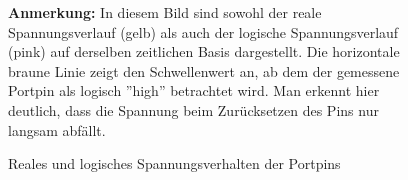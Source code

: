 \begin{figure}[h]
\begin{center}
 \caption{\label{impl_messbild} Reales und logisches Spannungsverhalten der Portpins}
\end{center}
 \textbf{Anmerkung:} In diesem Bild sind sowohl der reale Spannungsverlauf (gelb) als
 auch der logische Spannungsverlauf (pink) auf derselben zeitlichen Basis dargestellt.
 Die horizontale braune Linie zeigt den Schwellenwert an, ab dem der gemessene Portpin
 als logisch ''high'' betrachtet wird. Man erkennt hier deutlich, dass die Spannung
 beim Zurücksetzen des Pins nur langsam abfällt.
\end{figure}

